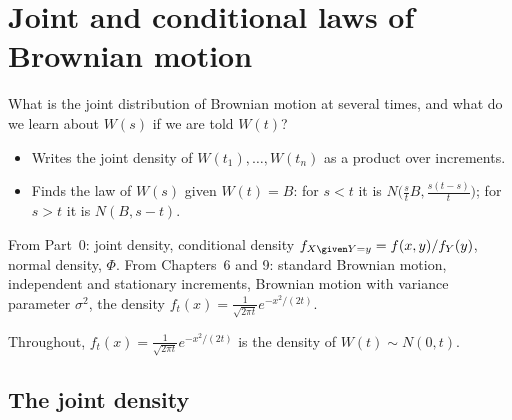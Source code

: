 \chapter{Joint and conditional laws of Brownian motion}
\label{ch:joint}

\begin{question}
What is the joint distribution of Brownian motion at several times, and what do we learn about $W(s)$ if we are told $W(t)$?
\end{question}

\begin{whatfor}
\begin{itemize}
  \item Writes the joint density of $W(t_1),\dots,W(t_n)$ as a product over increments.
  \item Finds the law of $W(s)$ given $W(t)=B$: for $s<t$ it is $N\big(\frac stB,\frac{s(t-s)}{t}\big)$; for $s>t$ it is $N(B,s-t)$.
\end{itemize}
\end{whatfor}

\begin{prereq}
From Part~0: joint density, conditional density $f_{X\given Y=y}=f(x,y)/f_Y(y)$, normal density, $\Phi$. From Chapters~6 and 9: standard Brownian motion, independent and stationary increments, Brownian motion with variance parameter $\sigma^2$, the density $f_t(x)=\frac{1}{\sqrt{2\pi t}}e^{-x^2/(2t)}$.
\end{prereq}

Throughout, $f_t(x)=\frac{1}{\sqrt{2\pi t}}e^{-x^2/(2t)}$ is the density of $W(t)\sim N(0,t)$.

\section{The joint density}

